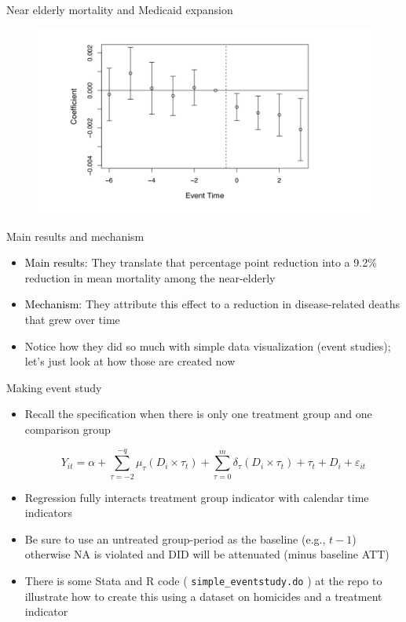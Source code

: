 \documentclass{beamer}
\begin{document}
\begin{frame}{Near elderly mortality and Medicaid expansion}

	\begin{figure}
	\includegraphics[scale=0.3]{./lecture_includes/Miller_Medicaid4.png}
	\end{figure}

\end{frame}

\begin{frame}{Main results and mechanism}

\begin{itemize}
\item \textcolor{black}{Main results}: They translate that percentage point reduction into a 9.2\% reduction in mean mortality among the near-elderly
\item \textcolor{black}{Mechanism}: They attribute this effect to a reduction in disease-related deaths that grew over time 
\item Notice how they did so much with simple data visualization (event studies); let's just look at how those are created now
\end{itemize}

\end{frame}

\begin{frame}{Making event study}

\begin{itemize}
\item Recall the specification when there is only one treatment group and one comparison group

 $$Y_{it} = \alpha + \sum_{\tau=-2}^{-q}\mu_{\tau} (D_i \times \tau_t) + \sum_{\tau=0}^m\delta_{\tau} (D_i \times \tau_t) + \tau_t + D_i + \varepsilon_{it}$$

\item Regression fully interacts treatment group indicator with calendar time indicators
\item Be sure to use an untreated group-period as the baseline (e.g., $t-1$) otherwise NA is violated and DID will be attenuated (minus baseline ATT)
\item There is some Stata and R code ( \texttt{simple\_eventstudy.do} ) at the repo to illustrate how to create this using a dataset on homicides and a treatment indicator
\end{itemize}

\end{frame}
\end{document}
